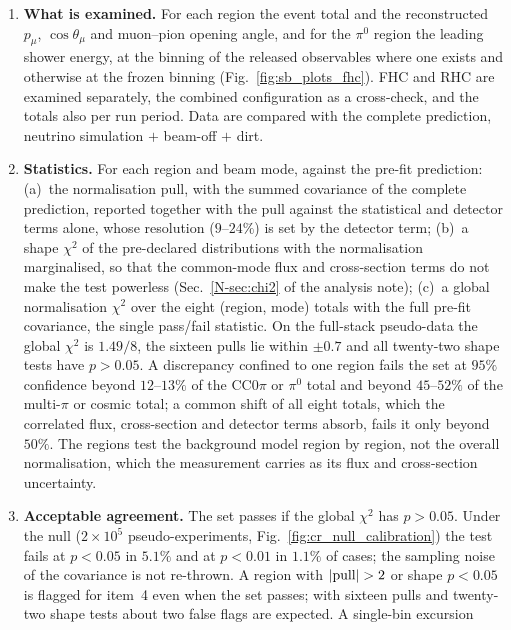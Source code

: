 \documentclass[11pt,a4paper]{article}
\newcommand{\noteref}[2]{#1~\ref{N-#2} of the analysis note}
\begin{document}
\begin{enumerate}\itemsep2pt
  \item \textbf{What is examined.} For each region the event total and the reconstructed $p_\mu$,
    $\cos\theta_\mu$ and muon--pion opening angle, and for the $\pi^0$ region the leading shower energy,
    at the binning of the released observables where one exists and otherwise at the frozen binning
    (Fig.~\ref{fig:sb_plots_fhc}). FHC and RHC are examined separately, the combined configuration as a
    cross-check, and the totals also per run period. Data are compared with the complete prediction,
    neutrino simulation $+$ beam-off $+$ dirt.
  \item \textbf{Statistics.} For each region and beam mode, against the pre-fit prediction: (a)~the
    normalisation pull, with the summed covariance of the complete prediction, reported together with
    the pull against the statistical and detector terms alone, whose resolution ($9$--$24\%$) is set by
    the detector term; (b)~a shape $\chi^2$ of the pre-declared distributions with the normalisation
    marginalised, so that the common-mode flux and cross-section terms do not make the test powerless
    (\noteref{Sec.}{sec:chi2}); (c)~a global normalisation $\chi^2$ over the eight (region, mode) totals
    with the full pre-fit covariance, the single pass/fail statistic. On the full-stack pseudo-data the
    global $\chi^2$ is $1.49/8$, the sixteen pulls lie within $\pm0.7$ and all twenty-two shape tests
    have $p>0.05$. A discrepancy confined to one region fails the set at $95\%$ confidence beyond $12$--$13\%$
    of the CC$0\pi$ or $\pi^0$ total and beyond $45$--$52\%$ of the multi-$\pi$ or cosmic total; a common
    shift of all eight totals, which the correlated flux, cross-section and detector terms absorb, fails
    it only beyond $50\%$. The regions test the background model region by region, not the overall
    normalisation, which the measurement carries as its flux and cross-section uncertainty.
  \item \textbf{Acceptable agreement.} The set passes if the global $\chi^2$ has $p>0.05$. Under the null
    ($2\times10^5$ pseudo-experiments, Fig.~\ref{fig:cr_null_calibration}) the test fails at $p<0.05$ in
    $5.1\%$ and at $p<0.01$ in $1.1\%$ of cases; the sampling noise of the covariance is not re-thrown.
    A region with $|{\rm pull}|>2$ or shape $p<0.05$ is flagged for item~4 even when the set passes; with
    sixteen pulls and twenty-two shape tests about two false flags are expected. A single-bin excursion

\end{enumerate}
\end{document}
